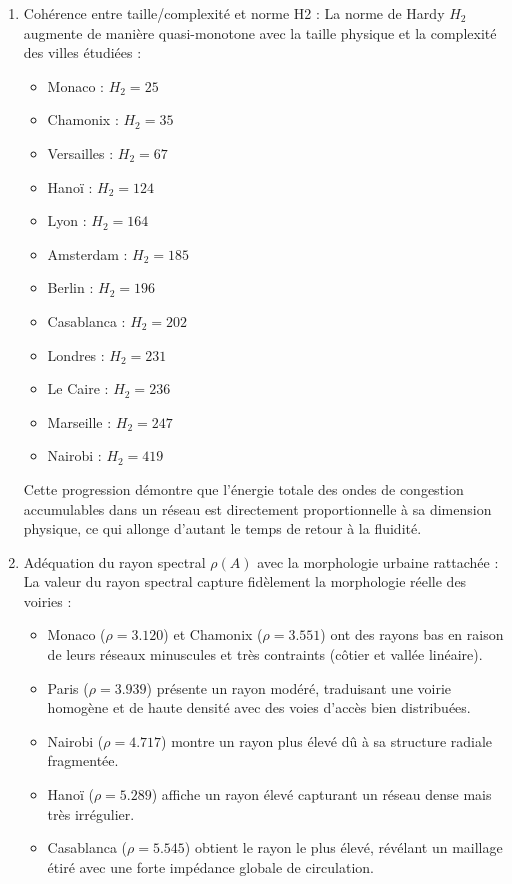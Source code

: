 \documentclass[10pt, a4paper]{article}
\providecommand{\tightlist}{}
\begin{document}
\begin{enumerate}
  Plus la non-normalité augmente, plus la constante de Kreiss augmente.
  C'est ce que prédit la théorie des matrices non-normales : une forte
  asymétrie engendre des pseudospectres étendus dans le plan complexe,
  ce qui accroît le supremum de la résolvante et se traduit par une
  constante de Kreiss élevée.
\item
  Cohérence entre taille/complexité et norme H2 : La norme de Hardy
  \(H_2\) augmente de manière quasi-monotone avec la taille physique et
  la complexité des villes étudiées :

  \begin{itemize}
  \tightlist
  \item
    Monaco : \(H_2 = 25\)
  \item
    Chamonix : \(H_2 = 35\)
  \item
    Versailles : \(H_2 = 67\)
  \item
    Hanoï : \(H_2 = 124\)
  \item
    Lyon : \(H_2 = 164\)
  \item
    Amsterdam : \(H_2 = 185\)
  \item
    Berlin : \(H_2 = 196\)
  \item
    Casablanca : \(H_2 = 202\)
  \item
    Londres : \(H_2 = 231\)
  \item
    Le Caire : \(H_2 = 236\)
  \item
    Marseille : \(H_2 = 247\)
  \item
    Nairobi : \(H_2 = 419\)
  \end{itemize}

  Cette progression démontre que l'énergie totale des ondes de
  congestion accumulables dans un réseau est directement proportionnelle
  à sa dimension physique, ce qui allonge d'autant le temps de retour à
  la fluidité.
\item
  Adéquation du rayon spectral \(\rho(A)\) avec la morphologie urbaine
  rattachée : La valeur du rayon spectral capture fidèlement la
  morphologie réelle des voiries :

  \begin{itemize}
  \tightlist
  \item
    Monaco (\(\rho = 3.120\)) et Chamonix (\(\rho = 3.551\)) ont des
    rayons bas en raison de leurs réseaux minuscules et très contraints
    (côtier et vallée linéaire).
  \item
    Paris (\(\rho = 3.939\)) présente un rayon modéré, traduisant une
    voirie homogène et de haute densité avec des voies d'accès bien
    distribuées.
  \item
    Nairobi (\(\rho = 4.717\)) montre un rayon plus élevé dû à sa
    structure radiale fragmentée.
  \item
    Hanoï (\(\rho = 5.289\)) affiche un rayon élevé capturant un réseau
    dense mais très irrégulier.
  \item
    Casablanca (\(\rho = 5.545\)) obtient le rayon le plus élevé,
    révélant un maillage étiré avec une forte impédance globale de
    circulation.
  \end{itemize}
\end{enumerate}
\end{document}
